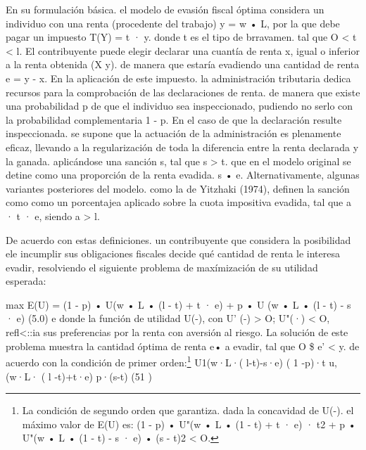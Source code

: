 \documentclass[10pt,a4paper]{article}
\begin{document}
En su formulación básica. el modelo de evasión fiscal óptima considera un individuo con una renta (procedente del trabajo) y = w • L, por la que debe pagar un impuesto T(Y) = t · y. donde t es el tipo de brravamen. tal que O < t < l. El contribuyente puede elegir declarar una cuantía de renta x, igual o inferior a la renta obtenida (X y). de manera que estaría evadiendo una cantidad de renta e = y - x. En la aplicación de este impuesto. la administración tributaria dedica recursos para la comprobación de las declaraciones de renta. de manera que existe una probabilidad p de que el individuo sea inspeccionado, pudiendo no serlo con la probabilidad complementaria 1 - p. En el caso de que la declaración resulte inspeccionada. se supone que la actuación de la administración es plenamente eficaz, llevando a la regularización de toda la diferencia entre la renta declarada y la ganada. aplicándose una sanción s, tal que s > t. que en el modelo original se detine como una proporción de la renta evadida. s • e. Alternativamente, algunas variantes posteriores del modelo. como la de Yitzhaki (1974), definen la sanción como como un porcentajea aplicado sobre la cuota impositiva evadida, tal que a · t · e, siendo a > l.

De acuerdo con estas definiciones. un contribuyente que considera la posibilidad ele incumplir sus obligaciones fiscales decide qué cantidad de renta le interesa evadir, resolviendo el siguiente problema de maxímización de su utilidad esperada: 

max E(U) = (1 - p) • U(w • L • (l - t) + t · e) + p • U (w • L • (l - t) - s · e) (5.0) e donde la función de utilidad U(-), con U' (-) > O; U"(·) < O, refl<::ia sus preferencias por la renta con aversión al riesgo. La solución de este problema muestra la cantidad óptima de renta e• a evadir, tal que O \$ e' < y. de acuerdo con la condición de primer orden:\footnote{%
    La condición de segundo orden que garantiza. dada la concavidad de U(-). el máximo valor de E(U) es: (1 - p) • U"(w • L • (1 - t) + t · e) · t2 + p • U"(w • L • (1 - t) - s · e) • (s - t)2 < O.
}
U1(w·L·( l-t)-s·e) ( 1 -p)·t
u,(w·L· ( l -t)+t·e) p·(s-t) (51 )
\end{document}
